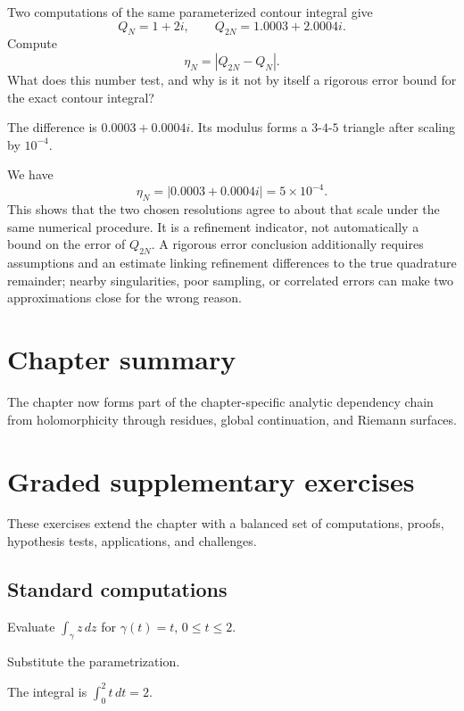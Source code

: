 \begin{exercise}\label{exr:iv04-numerical-contour-01}
Two computations of the same parameterized contour integral give
\[
Q_N=1+2i,
\qquad
Q_{2N}=1.0003+2.0004i.
\]
Compute
\[
\eta_N=|Q_{2N}-Q_N|.
\]
What does this number test, and why is it not by itself a rigorous error bound
for the exact contour integral?
\end{exercise}
\begin{hint}
The difference is \(0.0003+0.0004i\).  Its modulus forms a \(3\)-\(4\)-\(5\)
triangle after scaling by \(10^{-4}\).
\end{hint}
\begin{solution}
We have
\[
\eta_N
=
|0.0003+0.0004i|
=
5\times10^{-4}.
\]
This shows that the two chosen resolutions agree to about that scale under the
same numerical procedure.  It is a refinement indicator, not automatically a
bound on the error of \(Q_{2N}\).  A rigorous error conclusion additionally
requires assumptions and an estimate linking refinement differences to the
true quadrature remainder; nearby singularities, poor sampling, or correlated
errors can make two approximations close for the wrong reason.
\end{solution}

\section*{Chapter summary}
The chapter now forms part of the chapter-specific analytic dependency chain from holomorphicity through residues, global continuation, and Riemann surfaces.
\section{Graded supplementary exercises}
These exercises extend the chapter with a balanced set of computations, proofs, hypothesis tests, applications, and challenges.

\subsection*{Standard computations}

\begin{exercise}\label{exr:iv04-expand-01}
Evaluate \(\int_\gamma z\,dz\) for \(\gamma(t)=t\), \(0\le t\le2\).
\end{exercise}
\begin{hint}
Substitute the parametrization.
\end{hint}
\begin{solution}
The integral is \(\int_0^2 t\,dt=2\).
\end{solution}

